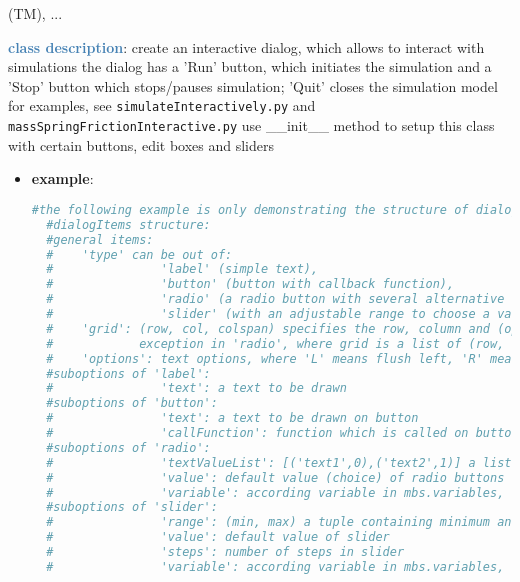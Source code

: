 \begin{itemize}[leftmargin=1.4cm]
\begin{itemize}[leftmargin=1.4cm]
\begin{itemize}[leftmargin=0.5cm]
\begin{itemize}[leftmargin=1.4cm]
\begin{itemize}[leftmargin=1.4cm]
\begin{itemize}[leftmargin=0.5cm]
\begin{itemize}[leftmargin=1.4cm]
\begin{itemize}[leftmargin=0.5cm]
\begin{itemize}[leftmargin=1.4cm]
\begin{itemize}[leftmargin=1.4cm]
 (TM), 
 ...

\ei

%
\noindent\textcolor{steelblue}{{\bf class description}}:  create an interactive dialog, which allows to interact with simulations
the dialog has a 'Run' button, which initiates the simulation and a 'Stop' button which stops/pauses simulation; 'Quit' closes the simulation model
for examples, see \texttt{simulateInteractively.py} and \texttt{massSpringFrictionInteractive.py}
use \_\_init\_\_ method to setup this class with certain buttons, edit boxes and sliders
\setlength{\itemindent}{0.7cm}
\begin{itemize}[leftmargin=0.7cm]
\item[--]
{\bf example}: \vspace{-12pt}\ei\begin{lstlisting}[language=Python, xleftmargin=36pt]
  #the following example is only demonstrating the structure of dialogItems and plots
  #dialogItems structure:
  #general items:
  #    'type' can be out of:
  #               'label' (simple text),
  #               'button' (button with callback function),
  #               'radio' (a radio button with several alternative options),
  #               'slider' (with an adjustable range to choose a value)
  #    'grid': (row, col, colspan) specifies the row, column and (optionally) the span of columns the item is placed at;
  #            exception in 'radio', where grid is a list of (row, col) for every choice
  #    'options': text options, where 'L' means flush left, 'R' means flush right
  #suboptions of 'label':
  #               'text': a text to be drawn
  #suboptions of 'button':
  #               'text': a text to be drawn on button
  #               'callFunction': function which is called on button-press
  #suboptions of 'radio':
  #               'textValueList': [('text1',0),('text2',1)] a list of texts with according values
  #               'value': default value (choice) of radio buttons
  #               'variable': according variable in mbs.variables, which is set to current radio button value
  #suboptions of 'slider':
  #               'range': (min, max) a tuple containing minimum and maximum value of slider
  #               'value': default value of slider
  #               'steps': number of steps in slider
  #               'variable': according variable in mbs.variables, which is set to current slider value

\end{lstlisting}
\end{itemize}
\end{itemize}
\end{itemize}
\end{itemize}
\end{itemize}
\end{itemize}
\end{itemize}
\end{itemize}
\end{itemize}
\end{itemize}
\end{itemize}
